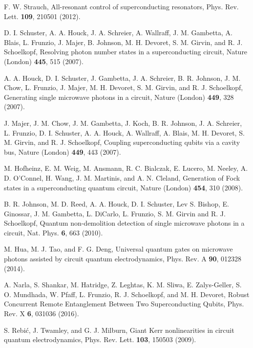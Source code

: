 \documentclass[showpacs,aps,graphicx,twocolumn]{revtex4}
\begin{document}
\begin{thebibliography}{1}
 F. W. Strauch, All-resonant control of superconducting resonators,
Phys. Rev. Lett. \textbf{109}, 210501 (2012).









 D. I. Schuster, A. A. Houck, J. A. Schreier, A. Wallraff,
J. M. Gambetta, A. Blais, L. Frunzio, J. Majer, B. Johnson, M. H. Devoret,
S. M. Girvin, and R. J. Schoelkopf, Resolving photon number states in a superconducting circuit,
Nature (London) \textbf{445}, 515 (2007).


 A. A. Houck, D. I. Schuster, J. Gambetta, J. A. Schreier,
B. R. Johnson, J. M. Chow, L. Frunzio, J. Majer, M. H. Devoret, S. M. Girvin,
and R. J. Schoelkopf, Generating single microwave photons in a circuit,
Nature (London) \textbf{449}, 328 (2007).


 J. Majer, J. M. Chow, J. M. Gambetta, J. Koch,
B. R. Johnson, J. A. Schreier, L. Frunzio, D. I. Schuster,
A. A. Houck, A. Wallraff, A. Blais, M. H. Devoret, S. M. Girvin,
and R. J. Schoelkopf, Coupling superconducting qubits via a cavity bus,
Nature (London) \textbf{449}, 443 (2007).


 M. Hofheinz, E. M. Weig, M. Ansmann, R. C. Bialczak,
E. Lucero, M. Neeley, A. D. O'Connel, H. Wang, J. M. Martinis,
and A. N. Cleland, Generation of Fock states in a superconducting quantum circuit,
Nature (London) \textbf{454}, 310 (2008).


 B. R. Johnson, M. D. Reed, A. A. Houck,
D. I. Schuster, Lev S. Bishop, E. Ginossar, J. M. Gambetta,
L. DiCarlo, L. Frunzio, S. M. Girvin and R. J. Schoelkopf,
Quantum non-demolition detection of single microwave photons in a circuit,
Nat. Phys. \textbf{6}, 663 (2010).



 M. Hua,  M. J. Tao, and F. G. Deng,
Universal quantum gates on microwave photons assisted by circuit quantum electrodynamics,
Phys. Rev. A \textbf{90}, 012328 (2014).


 A. Narla, S. Shankar, M. Hatridge, Z. Leghtas, K. M. Sliwa, E. Zalys-Geller, S. O. Mundhada, W. Pfaff, L. Frunzio, R. J. Schoelkopf, and M. H. Devoret, Robust Concurrent Remote Entanglement Between Two Superconducting Qubits, Phys. Rev. X \textbf{6}, 031036 (2016).

 S. Rebi\'{c}, J. Twamley, and G. J. Milburn,
Giant Kerr nonlinearities in circuit quantum electrodynamics,
Phys. Rev. Lett. \textbf{103}, 150503 (2009).



\end{thebibliography}
\end{document}
